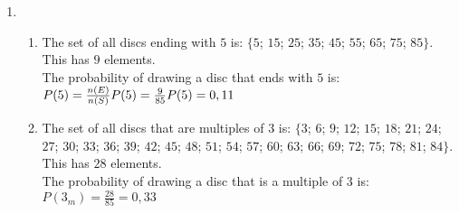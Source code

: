 \begin{solutions}{}
{\begin{enumerate}[itemsep=5pt, label=\textbf{\arabic*}. ]
\begin{enumerate}[noitemsep, label=\textbf{(\alph*)} ]
    \item The probability of a randomly selected child being a 4 year old male is:\\
    $P(\mbox{male}) = \frac{7}{30}\\
	      = 0,23$

    \item There are $6 + 2 + 5 + 7 = 20$ children aged 3 or 4.\\
    The probability of a randomly selected child being either 3 or 4 is:\\
    $\frac{20}{30} = 0,67$

    \item A child cannot be both 3 and 4, so the probability is $0$.

    \item This is the same as a randomly selected child being either 3 or 4 and so is $0,67$.

    \item The probability of a child being either 3 or female is:\\
    $P(3 \cup \mbox{female}) = P(3) + P(\mbox{female}) - P(3 \cap \mbox{female})\\
		      = \frac{10}{30} + 0,5 - \frac{10}{30} \times \frac{15}{30}\\
		      = 0,67$
    \end{enumerate}
    
\item %
    \begin{enumerate}[noitemsep, label=\textbf{(\alph*)} ]
    \item The set of all discs ending with $5$ is: $\{5$; $15$; $25$; $35$; $45$; $55$; $65$; $75$; $85\}$. This has $9$ elements.\\
 
    The probability of drawing a disc that ends with $5$ is:\\
    $P(5) = \frac{n(E)}{n(S)}\\
     P(5) = \frac{9}{85}\\
     P(5) = 0,11$

    \item The set of all discs that are multiples of $3$ is: $\{3$; $6$; $ 9$; $ 12$; $ 15$; $ 18$; $ 21$; $ 24$; $ 27$; $ 30$; $ 33$; $ 36$; $ 39$; $ 42$; $ 45$; $ 48$; $ 51$; $ 54$; $ 57$; $ 60$; $ 63$; $ 66$; $ 69$; $ 72$; $ 75$; $ 78$; $ 81$; $ 84\}$. This has $28$ elements.\\
 
    The probability of drawing a disc that is a multiple of $3$ is:
    $P(3_m) = \frac{28}{85}
	    = 0,33$


\end{enumerate}
\end{enumerate}}
\end{solutions}

